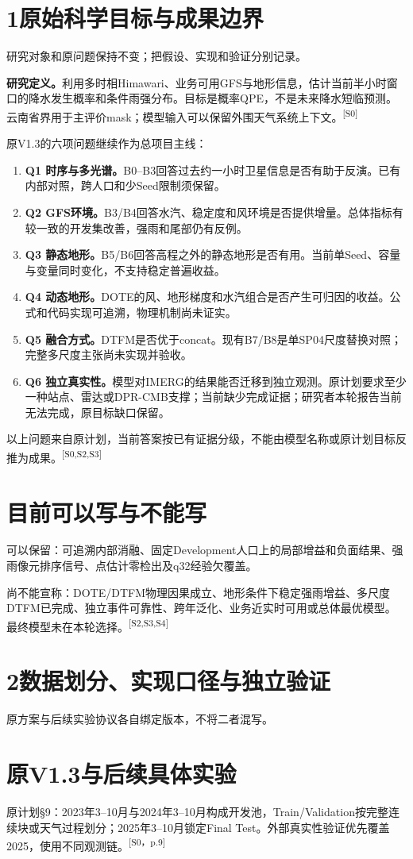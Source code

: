 \documentclass[UTF8,10.5pt,a4paper,fontset=none]{ctexart}
\newcommand{\evi}[1]{\textsuperscript{\color{muted}[#1]}}
\newcommand{\pageheading}[2]{\clearpage\section*{#1}\textcolor{muted}{#2}\par\vspace{3pt}}
\begin{document}
\pageheading{1\quad 原始科学目标与成果边界}{研究对象和原问题保持不变；把假设、实现和验证分别记录。}
\textbf{研究定义。}利用多时相Himawari、业务可用GFS与地形信息，估计当前半小时窗口的降水发生概率和条件雨强分布。目标是概率QPE，不是未来降水短临预测。云南省界用于主评价mask；模型输入可以保留外围天气系统上下文。\evi{S0}

原V1.3的六项问题继续作为总项目主线：
\begin{enumerate}[leftmargin=2em,itemsep=6pt]
\item \textbf{Q1 时序与多光谱。}B0--B3回答过去约一小时卫星信息是否有助于反演。已有内部对照，跨人口和少Seed限制须保留。
\item \textbf{Q2 GFS环境。}B3/B4回答水汽、稳定度和风环境是否提供增量。总体指标有较一致的开发集改善，强雨和尾部仍有反例。
\item \textbf{Q3 静态地形。}B5/B6回答高程之外的静态地形是否有用。当前单Seed、容量与变量同时变化，不支持稳定普遍收益。
\item \textbf{Q4 动态地形。}DOTE的风、地形梯度和水汽组合是否产生可归因的收益。公式和代码实现可追溯，物理机制尚未证实。
\item \textbf{Q5 融合方式。}DTFM是否优于concat。现有B7/B8是单SP04尺度替换对照；完整多尺度主张尚未实现并验收。
\item \textbf{Q6 独立真实性。}模型对IMERG的结果能否迁移到独立观测。原计划要求至少一种站点、雷达或DPR-CMB支撑；当前缺少完成证据；研究者本轮报告当前无法完成，原目标缺口保留。
\end{enumerate}
以上问题来自原计划，当前答案按已有证据分级，不能由模型名称或原计划目标反推为成果。\evi{S0,S2,S3}

\section*{目前可以写与不能写}
可以保留：可追溯内部消融、固定Development人口上的局部增益和负面结果、强雨像元排序信号、点估计零检出及q32经验欠覆盖。

尚不能宣称：DOTE/DTFM物理因果成立、地形条件下稳定强雨增益、多尺度DTFM已完成、独立事件可靠性、跨年泛化、业务近实时可用或总体最优模型。最终模型未在本轮选择。\evi{S2,S3,S4}

\pageheading{2\quad 数据划分、实现口径与独立验证}{原方案与后续实验协议各自绑定版本，不将二者混写。}
\section*{原V1.3与后续具体实验}
原计划§9：2023年3--10月与2024年3--10月构成开发池，Train/Validation按完整连续块或天气过程划分；2025年3--10月锁定Final Test。外部真实性验证优先覆盖2025，使用不同观测链。\evi{S0，p.9}
\end{document}

